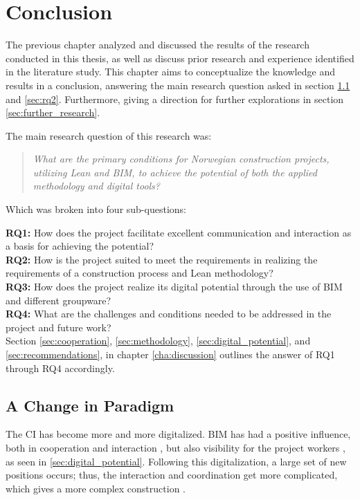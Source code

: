 
\chapter{Conclusion} \label{cha:conclusion}
The previous chapter analyzed and discussed the results of the research conducted in this thesis, as well as discuss prior research and experience identified in the literature study. This chapter aims to conceptualize the knowledge and results in a conclusion, answering the main research question asked in section \ref{sec:rq1} and \ref{sec:rq2}. Furthermore, giving a direction for further explorations in section \ref{sec:further_research}.

\noindent The main research question of this research was: 
\begin{quote}
    \textit{What are the primary conditions for Norwegian construction projects, utilizing Lean and BIM, to achieve the potential of both the applied methodology and digital tools?} 
\end{quote}

\noindent Which was broken into four sub-questions:

{\noindent \bf RQ1:} How does the project facilitate excellent communication and interaction as a basis for achieving the potential? \\
{\bf RQ2:} How is the project suited to meet the requirements in realizing the requirements of a construction process and Lean methodology? \\
{\bf RQ3:} How does the project realize its digital potential through the use of BIM and different groupware? \\
{\bf RQ4:} What are the challenges and conditions needed to be addressed in the project and future work? \\

Section \ref{sec:cooperation}, \ref{sec:methodology}, \ref{sec:digital_potential}, and \ref{sec:recommendations}, in chapter \ref{cha:discussion} outlines the answer of RQ1 through RQ4 accordingly.

\section{A Change in Paradigm} \label{sec:rq1}
The CI has become more and more digitalized. BIM has had a positive influence, both in cooperation and interaction \cite{frank_gehry, gu2010understanding}, but also visibility for the project workers \cite{arayici2010building}, as seen in \ref{sec:digital_potential}. Following this digitalization, a large set of new positions occurs; thus, the interaction and coordination get more complicated, which gives a more complex construction \cite{arayici2010building, eadie2013bim, arayici2011technology}.


